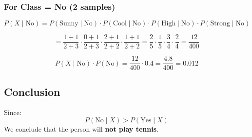 \documentclass{article}
\begin{document}
\subsubsection*{For Class = No (2 samples)}

$$
P(X \mid \text{No}) = P(\text{Sunny} \mid \text{No}) \cdot P(\text{Cool} \mid \text{No}) \cdot P(\text{High} \mid \text{No}) \cdot P(\text{Strong} \mid \text{No})
$$

$$
= \frac{1+1}{2+3} \cdot \frac{0+1}{2+3} \cdot \frac{2+1}{2+2} \cdot \frac{1+1}{2+2}
= \frac{2}{5} \cdot \frac{1}{5} \cdot \frac{3}{4} \cdot \frac{2}{4} = \frac{12}{400}
$$

$$
P(X \mid \text{No}) \cdot P(\text{No}) = \frac{12}{400} \cdot 0.4 = \frac{4.8}{400} = 0.012
$$

\subsection*{Conclusion}

Since:
$$
P(\text{No} \mid X) > P(\text{Yes} \mid X)
$$
We conclude that the person will \textbf{not play tennis}.
\end{document}
